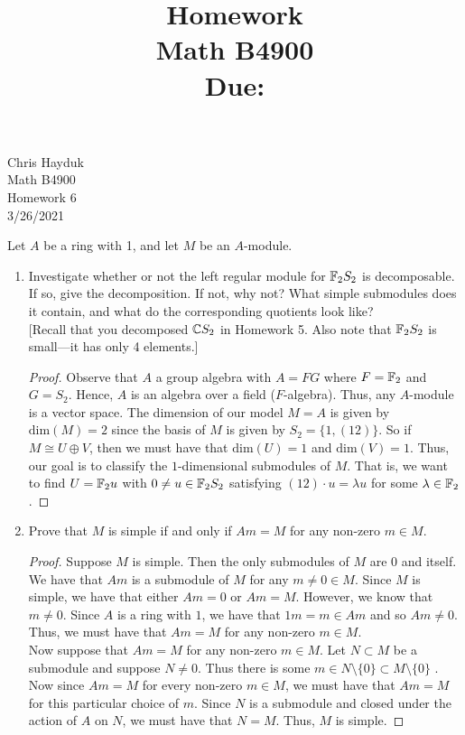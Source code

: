 \documentclass[11pt, reqno]{amsart}
\title[Homework \HW]{Homework \HW \\
Math B4900\\
\small Due: \DUE}
\author{}
\theoremstyle{plain}
\theoremstyle{definition}
\theoremstyle{example}
\def\dim{\mathrm{dim}}
\def\HW{6}
\def\DUE{3/26/2021}
\begin{document}
\begin{flushright}
Chris Hayduk\\
Math B4900\\
Homework \HW\\
\DUE
\end{flushright}


Let $A$ be a ring with 1, and let $M$ be an $A$-module.
\begin{enumerate}[1.]
\item Investigate whether or not the left regular module for $\mathbb{F}_2 S_2$ is decomposable. If so, give the decomposition. If not, why not? What simple submodules does it contain, and what do the corresponding quotients look like? \\
{[Recall that you decomposed $\mathbb{C} S_2$ in Homework 5.  Also note that $\mathbb{F}_2 S_2$ is small---it has only 4 elements.]}

\begin{proof}
Observe that $A$ a group algebra with $A = FG$ where $F = \mathbb{F}_2$ and $G = S_2$. Hence, $A$ is an algebra over a field ($F$-algebra). Thus, any $A$-module is a vector space. The dimension of our model $M = A$ is given by $\dim(M) = 2$ since the basis of $M$ is given by $S_2 = \{1, (12)\}$. So if $M \cong U \oplus V$, then we must have that $\dim(U) = 1$ and $\dim(V) = 1$. Thus, our goal is to classify the $1$-dimensional submodules of $M$. That is, we want to find $U = \mathbb{F}_2 u$ with $0 \neq u \in \mathbb{F}_2 S_2$ satisfying $(12) \cdot u = \lambda u$ for some $\lambda \in \mathbb{F}_2$.
\end{proof}

\item Prove that $M$ is simple if and only if $Am = M$ for any non-zero $m \in M$. 

\begin{proof}
Suppose $M$ is simple. Then the only submodules of $M$ are $0$ and itself. We have that $Am$ is a submodule of $M$ for any $m \neq 0 \in M$. Since $M$ is simple, we have that either $Am = 0$ or $Am = M$. However, we know that $m \neq 0$. Since $A$ is a ring with $1$, we have that $1m = m \in Am$ and so $Am \neq 0$. Thus, we must have that $Am = M$ for any non-zero $m \in M$.\\

Now suppose that $Am = M$ for any non-zero $m \in M$. Let $N \subset M$ be a submodule and suppose $N \neq 0$. Thus there is some $m \in N \setminus \{0\} \subset M \setminus \{0\}$ . Now since $Am = M$ for every non-zero $m \in M$, we must have that $Am = M$ for this particular choice of $m$. Since $N$ is a submodule and closed under the action of $A$ on $N$, we must have that $N = M$. Thus, $M$ is simple.
\end{proof}


\end{enumerate}
\end{document}
